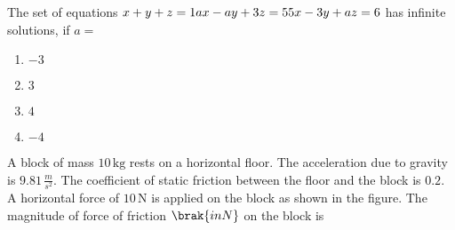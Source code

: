 \item The set of equations
$
x + y + z = 1 \\
a x - a y + 3 z = 5 \\
5 x - 3 y + a z = 6
$
has infinite solutions, if $a =$

\begin{enumerate}
    \item $-3$
    \item $3$
    \item $4$
    \item $-4$
\end{enumerate}

\item A block of mass $10 \, \text{kg}$ rests on a horizontal floor. The acceleration due to gravity is $9.81 \, \frac{m}{s^2}$. The coefficient of static friction between the floor and the block is $0.2$. A horizontal force of $10 \, \text{N}$ is applied on the block as shown in the figure. The magnitude of force of friction $\brak{in N}$ on the block is

\begin{figure}[!ht]
\centering
{}%

\label{fig:my_label}
\end{figure}


